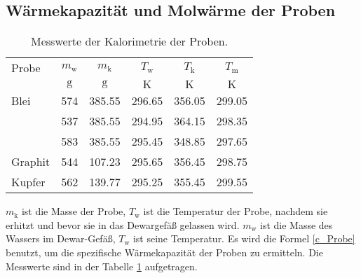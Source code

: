 \subsection{Wärmekapazität und Molwärme der Proben}
\begin{table}[htp]
	\centering
	\begin{tabular}{lccccc}
		\toprule
		{Probe}& {$m_\text{w}$} & {$m_\text{k}$} & {$T_\text{w}$} & {$T_\text{k}$} & {$T_\text{m}$}\\
		&{$\si{\gram}$}& {$\si{\gram}$}  &{$\si{\kelvin}$}& {$\si{\kelvin}$}  &{$\si{\kelvin}$}\\
		\midrule
		Blei		&574&	385.55	& 296.65 &	356.05&	299.05\\
					&537&	385.55	& 294.95 &	364.15&	298.35\\
					&583&	385.55	& 295.45 &	348.85&	297.65\\	
		Graphit		&544&	107.23	& 295.65 &	356.45&	298.75\\
		Kupfer		&562& 	139.77	& 295.25 &	355.45&	299.55\\
		\bottomrule
	\end{tabular}
	\caption{Messwerte der Kalorimetrie der Proben.}
	\label{tab:messung2}
\end{table}
$m_\text{k}$ ist die Masse der Probe, $T_\text{w}$ ist die Temperatur der Probe, nachdem sie erhitzt und bevor sie in das Dewargefäß gelassen wird.
$m_\text{w}$ ist die Masse des Wassers im Dewar-Gefäß, $T_\text{w}$ ist seine Temperatur.
Es wird die Formel \eqref{c_Probe}
benutzt, um die spezifische Wärmekapazität der Proben zu ermitteln.
Die Messwerte sind in der Tabelle \ref{tab:messung2} aufgetragen.

